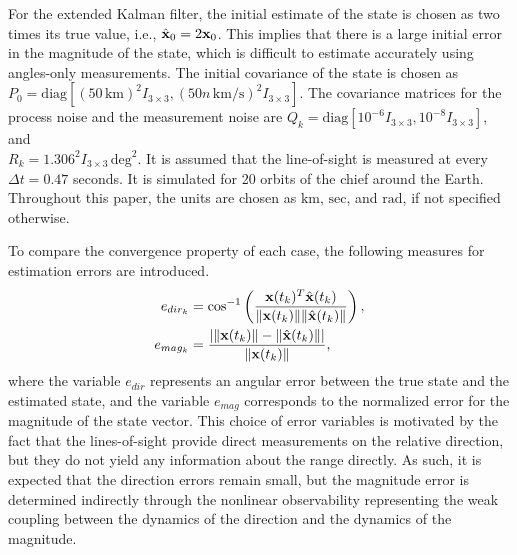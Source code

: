 For the extended Kalman filter, the initial estimate of the state is chosen as two times its true value, i.e., $\hat{\mathbf{x}}_0=2\mathbf{x}_0$. This implies that there is a large initial error in the magnitude of the state, which is difficult to estimate accurately using angles-only measurements. The initial covariance of the state is chosen as $P_0=\mathrm{diag}[(50\,\mathrm{km})^2I_{3\times 3}, (50n\,\mathrm{km/s})^2I_{3\times 3}]$. The covariance matrices for the process noise and the measurement noise are $Q_k=\mathrm{diag}[10^{-6}I_{3\times 3}, 10^{-8}I_{3\times 3}]$, and \\$R_k=1.306^2 I_{3\times 3}\,\mathrm{deg}^2$. It is assumed that the line-of-sight is measured at every $\Delta t = 0.47$ seconds. It is simulated for 20 orbits of the chief around the Earth. Throughout this paper, the units are chosen as $\mathrm{km}$, $\mathrm{sec}$, and $\mathrm{rad}$, if not specified otherwise. 

To compare the convergence property of each case, the following measures for estimation errors are introduced.
\begin{align*}
e_{dir_k}  & = \cos^{-1}\left( \frac{\mathbf{x}(t_k)^T \hat{\mathbf{x}} (t_k)}
{\|\mathbf{x}(t_k)\| \|\hat{\mathbf{x}} (t_k)\|} \right),\\
e_{mag_k}  & = 
\frac{|\|\mathbf{x}(t_k)\|-\|\hat{\mathbf{x}} (t_k)\||}{\|\mathbf{x}(t_k)\|},
\end{align*}
where the variable $e_{dir}$ represents an angular error between the true state and the estimated state, and the variable $e_{mag}$ corresponds to the normalized error for the magnitude of the state vector. This choice of error variables is motivated by the fact that the lines-of-sight provide direct measurements on the relative direction, but they do not yield any information about the range directly. As such, it is expected that the direction errors remain small, but the magnitude error is determined indirectly through the nonlinear observability representing the weak coupling between the dynamics of the direction and the dynamics of the magnitude. 

